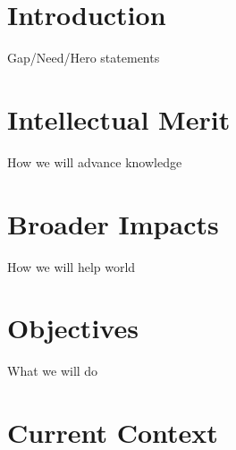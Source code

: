 \documentclass[11pt]{article}
\begin{document}
\pagestyle{empty} 
\setlength{\baselineskip}{12.6pt} %

\section{Introduction}
Gap/Need/Hero statements

\section{Intellectual Merit}
 How we will advance knowledge

\section{Broader Impacts}
 How we will help world

\section{Objectives}
What we will do 

\newpage

\section{Current Context}


\newpage
\printbibliography
\end{document}
